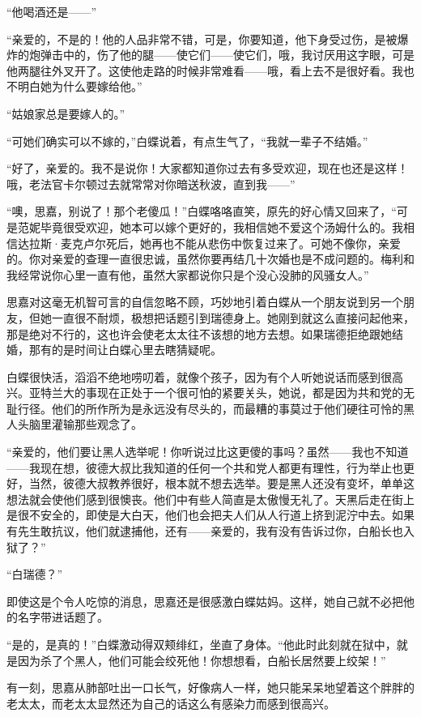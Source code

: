 \par “他喝酒还是——”
\par “亲爱的，不是的！他的人品非常不错，可是，你要知道，他下身受过伤，是被爆炸的炮弹击中的，伤了他的腿——使它们——使它们，哦，我讨厌用这字眼，可是他两腿往外叉开了。这使他走路的时候非常难看——哦，看上去不是很好看。我也不明白她为什么要嫁给他。”
\par “姑娘家总是要嫁人的。”
\par “可她们确实可以不嫁的，”白蝶说着，有点生气了，“我就一辈子不结婚。”
\par “好了，亲爱的。我不是说你！大家都知道你过去有多受欢迎，现在也还是这样！哦，老法官卡尔顿过去就常常对你暗送秋波，直到我——”
\par “噢，思嘉，别说了！那个老傻瓜！”白蝶咯咯直笑，原先的好心情又回来了，“可是范妮毕竟很受欢迎，她本可以嫁个更好的，我相信她不爱这个汤姆什么的。我相信达拉斯·麦克卢尔死后，她再也不能从悲伤中恢复过来了。可她不像你，亲爱的。你对亲爱的查理一直很忠诚，虽然你要再结几十次婚也是不成问题的。梅利和我经常说你心里一直有他，虽然大家都说你只是个没心没肺的风骚女人。”
\par 思嘉对这毫无机智可言的自信忽略不顾，巧妙地引着白蝶从一个朋友说到另一个朋友，但她一直很不耐烦，极想把话题引到瑞德身上。她刚到就这么直接问起他来，那是绝对不行的，这也许会使老太太往不该想的地方去想。如果瑞德拒绝跟她结婚，那有的是时间让白蝶心里去瞎猜疑呢。
\par 白蝶很快活，滔滔不绝地唠叨着，就像个孩子，因为有个人听她说话而感到很高兴。亚特兰大的事现在正处于一个很可怕的紧要关头，她说，都是因为共和党的无耻行径。他们的所作所为是永远没有尽头的，而最糟的事莫过于他们硬往可怜的黑人头脑里灌输那些观念了。
\par “亲爱的，他们要让黑人选举呢！你听说过比这更傻的事吗？虽然——我也不知道——我现在想，彼德大叔比我知道的任何一个共和党人都更有理性，行为举止也更好，当然，彼德大叔教养很好，根本就不想去选举。要是黑人还没有变坏，单单这想法就会使他们感到很懊丧。他们中有些人简直是太傲慢无礼了。天黑后走在街上是很不安全的，即使是大白天，他们也会把夫人们从人行道上挤到泥泞中去。如果有先生敢抗议，他们就逮捕他，还有——亲爱的，我有没有告诉过你，白船长也入狱了？”
\par “白瑞德？”
\par 即使这是个令人吃惊的消息，思嘉还是很感激白蝶姑妈。这样，她自己就不必把他的名字带进话题了。
\par “是的，是真的！”白蝶激动得双颊绯红，坐直了身体。“他此时此刻就在狱中，就是因为杀了个黑人，他们可能会绞死他！你想想看，白船长居然要上绞架！”
\par 有一刻，思嘉从肺部吐出一口长气，好像病人一样，她只能呆呆地望着这个胖胖的老太太，而老太太显然还为自己的话这么有感染力而感到很高兴。
